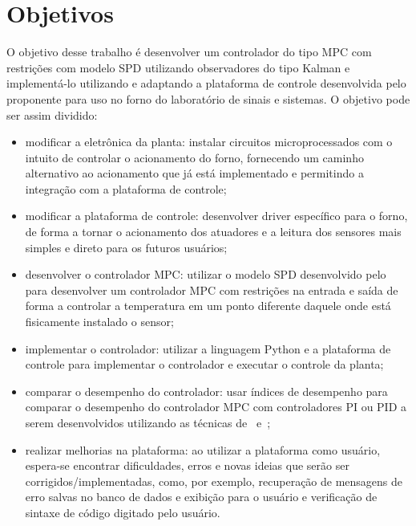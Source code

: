\section{Objetivos}%
\label{sec:objectives}

O objetivo desse trabalho é desenvolver um controlador do tipo \ac{MPC} com
restrições com modelo \ac{SPD} utilizando observadores do tipo Kalman e
implementá-lo utilizando e adaptando a plataforma de controle desenvolvida pelo
proponente para uso no forno do laboratório de sinais e sistemas. O objetivo
pode ser assim dividido:

\begin{itemize}
      \item modificar a eletrônica da planta: instalar circuitos
            microprocessados com o intuito de controlar o acionamento do forno,
            fornecendo um caminho alternativo ao acionamento que já está
            implementado e permitindo a integração com a plataforma de controle;
      \item modificar a plataforma de controle: desenvolver driver específico
            para o forno, de forma a tornar o acionamento dos atuadores e a
            leitura dos sensores mais simples e direto para os futuros usuários;
      \item desenvolver o controlador \ac{MPC}\@: utilizar o modelo \ac{SPD}
            desenvolvido pelo~\textcite{masterthesis:nelson} para desenvolver um
            controlador \ac{MPC} com restrições na entrada e saída de forma a
            controlar a temperatura em um ponto diferente daquele onde está
            fisicamente instalado o sensor;
      \item implementar o controlador: utilizar a linguagem Python e a
            plataforma de controle para implementar o controlador e executar o
            controle da planta;
      \item comparar o desempenho do controlador: usar índices de desempenho
            para comparar o desempenho do controlador \ac{MPC} com controladores
            PI ou PID a serem desenvolvidos utilizando as técnicas
            de~\textcite{article:clarke} e~\textcite{article:martins};
      \item realizar melhorias na plataforma: ao utilizar a plataforma como
            usuário, espera-se encontrar dificuldades, erros e novas ideias que
            serão ser corrigidos/implementadas, como, por exemplo, recuperação
            de mensagens de erro salvas no banco de dados e exibição para o
            usuário e verificação de sintaxe de código digitado pelo usuário.
\end{itemize}

